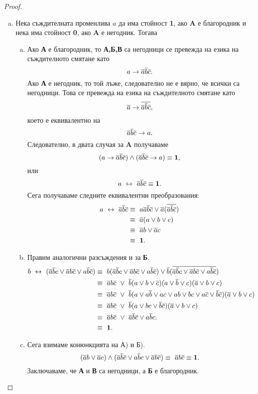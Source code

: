 \begin{proof}
  \begin{enumerate}[a)]
  \item
    Нека съждителната променлива $a$ да има стойност {\bf 1}, ако {\bf A} е благородник и нека има стойност {\bf 0}, 
    ако {\bf A} е негодник.
    Тогава
    \begin{enumerate}[a)]
    \item
      Ако {\bf А} е благородник, то {\bf А,Б,В} са негодници се превежда на езика на съждителното смятане като
      \[a \rightarrow \overline{a}\overline{b}\overline{c}.\]
      Ако {\bf А} е негодник, то той лъже, следователно не е вярно, че всички са негодници. Това се превежда на езика на съждителното смятане като
      \[\overline{a} \rightarrow \overline{\overline{a}\overline{b}\overline{c}},\] 
      което е еквивалентно на \[\overline{a}\overline{b}\overline{c}\rightarrow a.\]
      Следователно, в двата случая за {\bf A} получаваме
      \[(a \rightarrow \overline{a}\overline{b}\overline{c}) \wedge (\overline{a}\overline{b}\overline{c}\rightarrow a) \equiv \mathbf{1},\]
      или
      \[a \ \leftrightarrow\  \overline{a}\overline{b}\overline{c} \equiv \mathbf{1}.\]
      Сега получаваме следните еквивалентни преобразования:
      \begin{align*}
        a \ \leftrightarrow\  \overline{a}\overline{b}\overline{c} & \equiv\ a\overline{a}\overline{b}\overline{c} \vee \overline{a}(\overline{\overline{a}\overline{b}\overline{c}})\\
        & \equiv\ \overline{a}(a \vee b \vee c)\\
        & \equiv\ \overline{a}b \vee \overline{a}c\\
        & \equiv\ \mathbf{1}.
      \end{align*}
    \item
      Правим аналогични разсъждения и за {\bf Б}.
      \begin{align*}
        b \ \leftrightarrow\  (\overline{a}\overline{b}c\vee \overline{a}b\overline{c}\vee a\overline{b}\overline{c}) & \equiv\ b(\overline{a}\overline{b}c\vee \overline{a}b\overline{c}\vee a\overline{b}\overline{c})\vee \overline{b}(\overline{\overline{a}\overline{b}c\vee \overline{a}b\overline{c}\vee a\overline{b}\overline{c}})\\
        & \equiv\ \overline{a}b\overline{c}\ \vee\ \overline{b}(a\vee b \vee \overline{c})(a\vee\overline{b}\vee c)(\overline{a} \vee b \vee c)\\
        & \equiv\ \overline{a}b\overline{c}\ \vee\ \overline{b}(a \vee a\overline{b} \vee ac \vee ab \vee bc \vee a\overline{c} \vee \overline{b}\overline{c})(\overline{a} \vee b \vee c)\\
        & \equiv\ \overline{a}b\overline{c}\ \vee\ \overline{b}(a \vee bc \vee \overline{b}\overline{c})(\overline{a} \vee b \vee c)\\
        & \equiv\ \overline{a}b\overline{c}\ \vee\ \overline{a}\overline{b}\overline{c} \vee  a\overline{b}c.\\
        & \equiv\ \mathbf{1}. 
      \end{align*}
    \item
      Сега взимаме конюнкцията на А) и Б).
      \[(\overline{a}b \vee \overline{a}c)\wedge (\overline{a}\overline{b}\overline{c} \vee  a\overline{b}c \vee \overline{a}b\overline{c}) \equiv\ \overline{a}b\overline{c} \equiv {\mathbf 1}.\]
      Заключаваме, че {\bf А} и {\bf В} са негодници, а {\bf Б} е благородник.
    \end{enumerate}
  \end{enumerate}
\end{proof}

